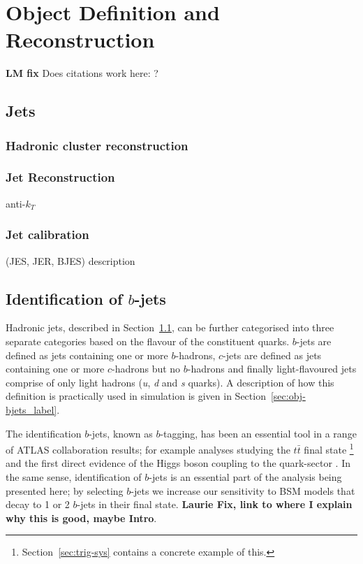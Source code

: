 \chapter{Object Definition and Reconstruction}
\label{sec:obj}
\textbf{LM fix} Does citations work here: \cite{trig-evtGen}?


\section{Jets}
\label{sec:obj-jets}
  \subsection{Hadronic cluster reconstruction}
  \subsection{Jet Reconstruction}
   anti-$k_T$
   \subsection{Jet calibration}
    (JES, JER, BJES) description
    
   \section{Identification of $b$-jets}
   \label{sec:obj-bjets}

   Hadronic jets, described in Section~\ref{sec:obj-jets}, can be further categorised into three separate categories based on the flavour of the constituent quarks.
   $b$-jets are defined as jets containing one or more $b$-hadrons,
   $c$-jets are defined as jets containing one or more $c$-hadrons but no $b$-hadrons
   and finally light-flavoured jets comprise of only light hadrons (\textit{u}, \textit{d} and \textit{s} quarks).
   A description of how this definition is practically used in simulation is given in Section~\ref{sec:obj-bjets_label}.

   The identification $b$-jets, known as $b$-tagging, has been an essential tool in a range of ATLAS collaboration results;
   for example analyses studying the $t\bar{t}$ final state \cite{obj-ttbar} \footnote{Section~\ref{sec:trig-sys} contains a concrete example of this.}
   and the first direct evidence of the Higgs boson coupling to the quark-sector \cite{obj-Hbb}.
   In the same sense, identification of $b$-jets is an essential part of the analysis being presented here;
   by selecting $b$-jets we increase our sensitivity to BSM models that decay to 1 or 2 $b$-jets in their final state.
   \textbf{Laurie Fix, link to where I explain why this is good, maybe Intro}.

